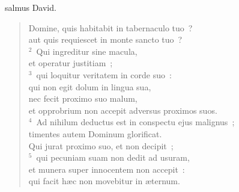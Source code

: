 \bchapter
{}salmus David. \begin{flushleft}\begin{verse}\vspace{6pt}Domine, quis habitabit in tabernaculo tuo~?\\ aut quis requiescet in monte sancto tuo~?\\
${}^{2}$~Qui ingreditur sine macula,\\ et operatur justitiam~;\\
${}^{3}$~qui loquitur veritatem in corde suo~:\\ qui non egit dolum in lingua sua,\\ nec fecit proximo suo malum,\\ et opprobrium non accepit adversus proximos suos.\\
${}^{4}$~Ad nihilum deductus est in conspectu ejus malignus~;\\ timentes autem Dominum glorificat.\\ Qui jurat proximo suo, et non decipit~;\\
${}^{5}$~qui pecuniam suam non dedit ad usuram,\\ et munera super innocentem non accepit~:\\ qui facit h\ae c non movebitur in \ae ternum.\end{verse}\end{flushleft}



